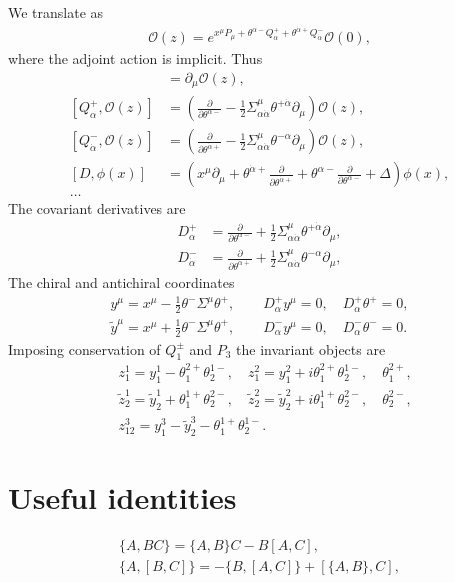 \documentclass[letterpaper]{article}
\let\Oldsection\section
\renewcommand{\section}{\FloatBarrier\Oldsection}
\def\Om{{\mathcal{O}}}
\def\a{{\alpha}}
\def\ad{{\dot{\alpha}}}
\begin{document}
We translate as
\begin{align}
 \Om(z) = e^{x^\mu P_\mu + \theta^{\a-} Q^+_\a + \theta^{\ad+} Q^-_\ad} \Om(0),
\end{align}
where the adjoint action is implicit. Thus
\begin{align}
 [P_\mu, \Om(z)] & = \partial_\mu \Om(z), \\
 [Q^+_\a, \Om(z)] & = \left( 
     \frac{\partial}{\partial \theta^{\a-}} 
   - \frac{1}{2} \Sigma^\mu_{\a\ad} \theta^{+\ad} \partial_\mu
 \right) \Om(z), \\
 [Q^-_\ad, \Om(z)] & = \left( 
     \frac{\partial}{\partial \theta^{\ad+}} 
   - \frac{1}{2} \Sigma^\mu_{\a\ad} \theta^{-\a} \partial_\mu
 \right) \Om(z), \\
 [D, \phi(x)] & =  \left(
      x^\mu \partial_\mu 
    + \theta^{\ad+} \frac{\partial}{\partial \theta^{\ad+}} 
    + \theta^{\a-}  \frac{\partial}{\partial \theta^{\a-}} 
    + \Delta
  \right) \phi(x), \\
 \ldots
\end{align}
The covariant derivatives are
\begin{align}
   D^+_\a 
 & = \frac{\partial}{\partial \theta^{\a-}} 
   + \frac{1}{2} \Sigma^\mu_{\a\ad} \theta^{+\ad} \partial_\mu, \\
   D^-_\ad
 & = \frac{\partial}{\partial \theta^{\ad+}} 
   + \frac{1}{2} \Sigma^\mu_{\a\ad} \theta^{-\a} \partial_\mu,
\end{align}
The chiral and antichiral coordinates
\begin{align}
 y^\mu = x^\mu - \frac{1}{2} \theta^- \Sigma^\mu \theta^+, \qquad
 D^+_\a y^\mu = 0, \quad
 D^+_\a \theta^+ = 0, \\
 \tilde y^\mu = x^\mu + \frac{1}{2} \theta^- \Sigma^\mu \theta^+, \qquad
 D^-_\a y^\mu = 0, \quad
 D^-_\a \theta^- = 0.
\end{align}
Imposing conservation of $Q_{1}^\pm$ and $P_3$ the invariant objects are
\begin{align}
 & z_1^1 = y_1^1 -   \theta_1^{2+} \theta_2^{1-}, \quad
   z_1^2 = y_1^2 + i \theta_1^{2+} \theta_2^{1-}, \quad
   \theta_1^{2+}, \\[0.5em]
 & \tilde z_2^1 = \tilde y_2^1 +   \theta_1^{1+} \theta_2^{2-}, \quad
   \tilde z_2^2 = \tilde y_2^2 + i \theta_1^{1+} \theta_2^{2-}, \quad
   \theta_2^{2-}, \\[0.5em]
 & z_{12}^3 = y_1^3 - \tilde y_2^3 - \theta_1^{1+} \theta_2^{1-}.
\end{align}



\appendix



\section{Useful identities}

\begin{align}
 \{ A, B C \} = \{ A, B \} C - B [A, C], \\
 \{ A, [B, C] \} = - \{ B, [A, C] \}  + [ \{A, B \}, C], \\
\end{align}
\end{document}
